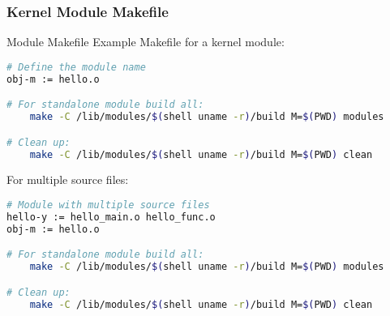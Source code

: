 \subsubsection{Kernel Module Makefile}

\begin{code}{Module Makefile}
    Example Makefile for a kernel module:
    
\begin{lstlisting}[language=bash, style=basesmol]
# Define the module name
obj-m := hello.o

# For standalone module build all:
	make -C /lib/modules/$(shell uname -r)/build M=$(PWD) modules

# Clean up:
	make -C /lib/modules/$(shell uname -r)/build M=$(PWD) clean
\end{lstlisting}

    For multiple source files:
    
\begin{lstlisting}[language=bash, style=basesmol]
# Module with multiple source files
hello-y := hello_main.o hello_func.o
obj-m := hello.o

# For standalone module build all:
	make -C /lib/modules/$(shell uname -r)/build M=$(PWD) modules

# Clean up:
	make -C /lib/modules/$(shell uname -r)/build M=$(PWD) clean
\end{lstlisting}
\end{code}

